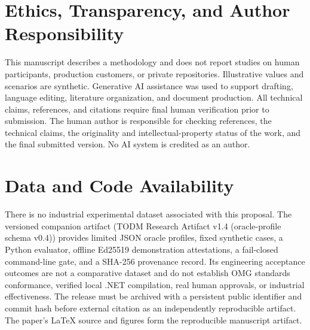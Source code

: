 \documentclass[11pt,a4paper]{article}
\begin{document}
\section*{Ethics, Transparency, and Author Responsibility}
This manuscript describes a methodology and does not report studies on human participants, production customers, or private repositories. Illustrative values and scenarios are synthetic. Generative AI assistance was used to support drafting, language editing, literature organization, and document production. All technical claims, references, and citations require final human verification prior to submission. The human author is responsible for checking references, the technical claims, the originality and intellectual-property status of the work, and the final submitted version. No AI system is credited as an author.

\section*{Data and Code Availability}
There is no industrial experimental dataset associated with this proposal. The versioned companion artifact (TODM Research Artifact v1.4 (oracle-profile schema v0.4)) provides limited JSON oracle profiles, fixed synthetic cases, a Python evaluator, offline Ed25519 demonstration attestations, a fail-closed command-line gate, and a SHA-256 provenance record. Its engineering acceptance outcomes are not a comparative dataset and do not establish OMG standards conformance, verified local .NET compilation, real human approvals, or industrial effectiveness. The release must be archived with a persistent public identifier and commit hash before external citation as an independently reproducible artifact. The paper's LaTeX source and figures form the reproducible manuscript artifact.



\end{document}
